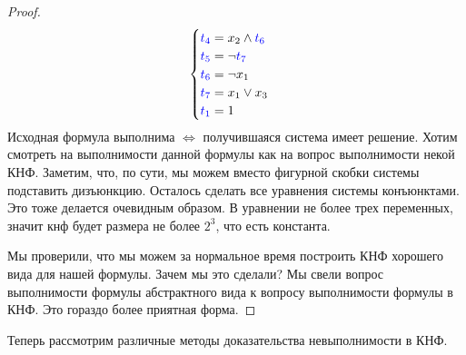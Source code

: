 \begin{proof}
\begin{gather*}
\begin{cases}
            \textcolor{blue}{t_4} = x_2 \land \textcolor{blue}{t_6} \\
            \textcolor{blue}{t_5} = \lnot \textcolor{blue}{t_7} \\
            \textcolor{blue}{t_6} = \lnot x_1 \\
            \textcolor{blue}{t_7} = x_1 \lor x_3 \\
            \textcolor{blue}{t_1} = 1
        \end{cases}
    \end{gather*} 
    Исходная формула выполнима $\Longleftrightarrow$ получившаяся система имеет решение. 
    Хотим смотреть на выполнимости данной формулы как на вопрос выполнимости некой КНФ. Заметим, что, по сути, 
    мы можем вместо фигурной скобки системы подставить дизъюнкцию. Осталось сделать все уравнения системы конъюнктами. Это тоже 
    делается очевидным образом. В уравнении не более трех переменных, значит кнф будет размера не более $2^3$, что есть константа. 

    Мы проверили, что мы можем за нормальное время построить КНФ хорошего вида для нашей формулы. 
    Зачем мы это сделали? Мы свели вопрос выполнимости формулы абстрактного вида к вопросу выполнимости формулы в КНФ. Это гораздо более приятная форма. 
\end{proof}

Теперь рассмотрим различные методы доказательства невыполнимости в КНФ. 
